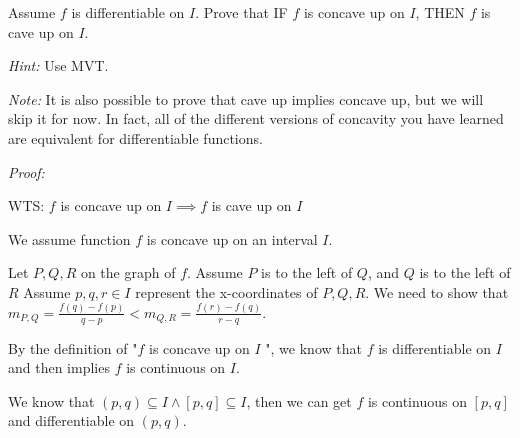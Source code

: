 \documentclass[12pt]{exam}
\newcommand{\vv}{\vspace{.1cm}}
\begin{document}
\begin{enumerate}
 Assume $f$ is differentiable on $I$. 
		Prove that IF $f$ is concave up on $I$, THEN $f$ is cave up on $I$.


\emph{Hint:}  Use MVT.

\emph{Note:}  It is also possible to prove that cave up implies concave up, but we will skip it for now.  In fact, all of the different versions of concavity you have learned are equivalent for differentiable functions.	

\vv

\emph{Proof:}

\vv

WTS: $f$ is concave up on $I \implies f$ is cave up on $I$



We assume function $f$ is concave up on an interval $I$.

Let $P, Q, R$ on the graph of $f$. Assume $P$ is to the left of $Q$, and $Q$ is to the left of $R$ Assume $p, q, r \in I$ represent the x-coordinates of $P, Q, R$.
We need to show that $m_{P,Q}=\frac{f(q)-f(p)}{q-p}<m_{Q,R}=\frac{f(r)-f(q)}{r-q}$.

By the definition of "$f$ is concave up on $I$ ", we know that $f$ is differentiable on $I$ and then implies $f$ is continuous on $I$.

We know that $(p,q)\subseteq I \land [p,q]\subseteq I$, then we can get $f$ is continuous on $[p,q]$ and differentiable on $(p,q)$.


\end{enumerate}
\end{document}
